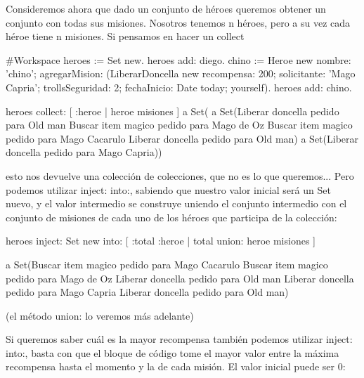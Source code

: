 \documentclass[a4paper,12pt]{book}
\begin{document}
\vspace{\baselineskip}
Consideremos ahora que dado un conjunto de héroes queremos obtener un conjunto con todas sus misiones.
Nosotros tenemos n héroes, pero a su vez cada héroe tiene n misiones. Si pensamos en hacer un collect

\begin{code}
#Workspace
heroes := Set new.
heroes add: diego.
chino := Heroe new 
               nombre: 'chino';
               agregarMision: (LiberarDoncella new
                                   recompensa: 200;
                                   solicitante: 'Mago Capria';
                                   trollsSeguridad: 2;
                                   fechaInicio: Date today;
                                   yourself).
heroes add: chino.

heroes collect: [ :heroe | heroe misiones ]
     a Set(
              a Set(Liberar doncella pedido para Old man 
                    Buscar item magico pedido para Mago de Oz 
                    Buscar item magico pedido para Mago Cacarulo 
                    Liberar doncella pedido para Old man) 
              a Set(Liberar doncella pedido para Mago Capria))
\end{code}

esto nos devuelve una colección de colecciones, que no es lo que queremos... 
\newline
\newline
Pero podemos utilizar inject: into:, sabiendo que nuestro valor inicial será un Set nuevo,
y el valor intermedio se construye uniendo el conjunto intermedio con el conjunto de misiones de cada uno de
los héroes que participa de la colección:

\begin{code}
heroes inject: Set new
       into: [ :total :heroe | total union: heroe misiones ]
       
a Set(Buscar item magico pedido para Mago Cacarulo 
      Buscar item magico pedido para Mago de Oz 
      Liberar doncella pedido para Old man 
      Liberar doncella pedido para Mago Capria 
      Liberar doncella pedido para Old man)       
\end{code}

(el método union: lo veremos más adelante)

\vspace{\baselineskip}
Si queremos saber cuál es la mayor recompensa también podemos utilizar inject: into:, basta
con que el bloque de código tome el mayor valor entre la máxima recompensa hasta el momento y
la de cada misión. El valor inicial puede ser 0:
\end{document}
